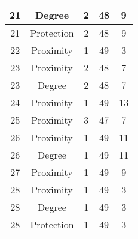 \documentclass[results.tex]{subfiles}
\begin{document}
\begin{center}
\begin{tabular}{| c || c | c | c | c |}
            \hline
            21                      & Degree                       & 2                      & 48                      & 9                    \\
            \hline
            21                      & Protection                   & 2                      & 48                      & 9                    \\
            \hline
            22                      & Proximity                    & 1                      & 49                      & 3                    \\
            \hline
            23                      & Proximity                    & 2                      & 48                      & 7                    \\
            \hline
            23                      & Degree                       & 2                      & 48                      & 7                    \\
            \hline
            24                      & Proximity                    & 1                      & 49                      & 13                   \\
            \hline
            25                      & Proximity                    & 3                      & 47                      & 7                    \\
            \hline
            26                      & Proximity                    & 1                      & 49                      & 11                   \\
            \hline
            26                      & Degree                       & 1                      & 49                      & 11                   \\
            \hline
            27                      & Proximity                    & 1                      & 49                      & 9                    \\
            \hline
            28                      & Proximity                    & 1                      & 49                      & 3                    \\
            \hline
            28                      & Degree                       & 1                      & 49                      & 3                    \\
            \hline
            28                      & Protection                   & 1                      & 49                      & 3                    \\

\end{tabular}
\end{center}
\end{document}
